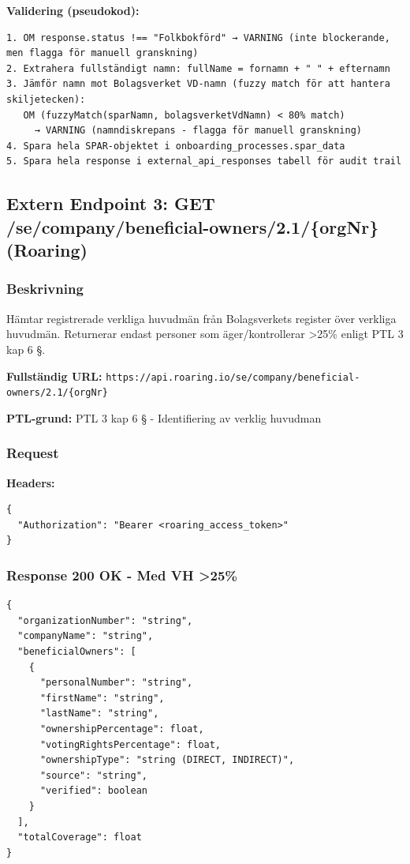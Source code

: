 \textbf{Validering (pseudokod):}
\begin{lstlisting}
1. OM response.status !== "Folkbokförd" → VARNING (inte blockerande, men flagga för manuell granskning)
2. Extrahera fullständigt namn: fullName = fornamn + " " + efternamn
3. Jämför namn mot Bolagsverket VD-namn (fuzzy match för att hantera skiljetecken):
   OM (fuzzyMatch(sparNamn, bolagsverketVdNamn) < 80% match)
     → VARNING (namndiskrepans - flagga för manuell granskning)
4. Spara hela SPAR-objektet i onboarding_processes.spar_data
5. Spara hela response i external_api_responses tabell för audit trail
\end{lstlisting}

\subsection{Extern Endpoint 3: GET /se/company/beneficial-owners/2.1/\{orgNr\} (Roaring)}

\subsubsection{Beskrivning}

Hämtar registrerade verkliga huvudmän från Bolagsverkets register över verkliga huvudmän. Returnerar endast personer som äger/kontrollerar >25\% enligt PTL 3 kap 6 §.

\textbf{Fullständig URL:} \texttt{https://api.roaring.io/se/company/beneficial-owners/2.1/\{orgNr\}}

\textbf{PTL-grund:} PTL 3 kap 6 § - Identifiering av verklig huvudman

\subsubsection{Request}

\textbf{Headers:}
\begin{lstlisting}
{
  "Authorization": "Bearer <roaring_access_token>"
}
\end{lstlisting}

\subsubsection{Response 200 OK - Med VH >25\%}

\begin{lstlisting}
{
  "organizationNumber": "string",
  "companyName": "string",
  "beneficialOwners": [
    {
      "personalNumber": "string",
      "firstName": "string",
      "lastName": "string",
      "ownershipPercentage": float,
      "votingRightsPercentage": float,
      "ownershipType": "string (DIRECT, INDIRECT)",
      "source": "string",
      "verified": boolean
    }
  ],
  "totalCoverage": float
}
\end{lstlisting}

